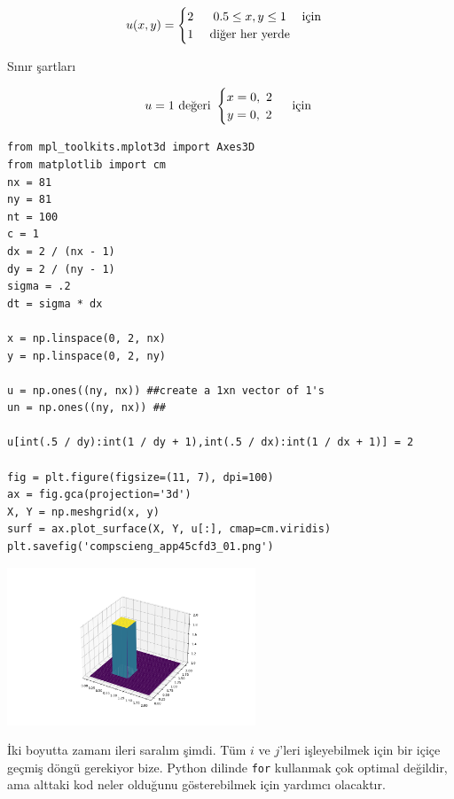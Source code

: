 \documentclass[12pt,fleqn]{article}\usepackage{../../common}
\begin{document}
$$
u(x,y) = \begin{cases}
\begin{matrix}
2\ & 0.5 \leq x, y \leq 1   & \text{için}  \cr
1\ & \text{diğer her yerde}
\end{matrix}\end{cases}
$$

Sınır şartları

$$
u = 1\ \text{değeri } \begin{cases}
\begin{matrix}
x =  0,\ 2 \cr
y =  0,\ 2 \end{matrix}\end{cases}
\text{ için }
$$

\begin{verbatim}
from mpl_toolkits.mplot3d import Axes3D    
from matplotlib import cm
nx = 81
ny = 81
nt = 100
c = 1
dx = 2 / (nx - 1)
dy = 2 / (ny - 1)
sigma = .2
dt = sigma * dx

x = np.linspace(0, 2, nx)
y = np.linspace(0, 2, ny)

u = np.ones((ny, nx)) ##create a 1xn vector of 1's
un = np.ones((ny, nx)) ##

u[int(.5 / dy):int(1 / dy + 1),int(.5 / dx):int(1 / dx + 1)] = 2 

fig = plt.figure(figsize=(11, 7), dpi=100)
ax = fig.gca(projection='3d')                      
X, Y = np.meshgrid(x, y)                            
surf = ax.plot_surface(X, Y, u[:], cmap=cm.viridis)
plt.savefig('compscieng_app45cfd3_01.png')
\end{verbatim}

\includegraphics[width=20em]{compscieng_app45cfd3_01.png}

İki boyutta zamanı ileri saralım şimdi. Tüm $i$ ve $j$'leri işleyebilmek için
bir içiçe geçmiş döngü gerekiyor bize. Python dilinde \verb!for! kullanmak çok
optimal değildir, ama alttaki kod neler olduğunu gösterebilmek için yardımcı
olacaktır.
\end{document}

